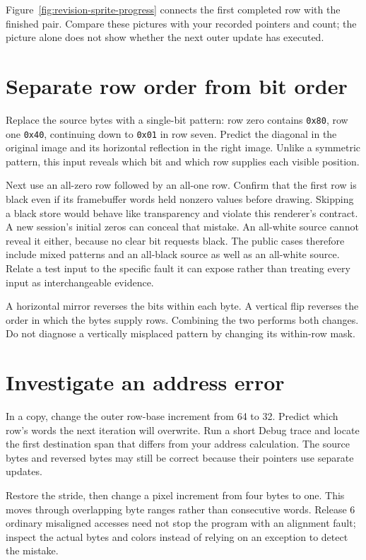 Figure~\ref{fig:revision-sprite-progress} connects the first completed row with
the finished pair. Compare these pictures with your recorded pointers and count;
the picture alone does not show whether the next outer update has executed.



\section{Separate row order from bit order}

Replace the source bytes with a single-bit pattern: row zero contains
\texttt{0x80}, row one \texttt{0x40}, continuing down to \texttt{0x01} in row
seven. Predict the diagonal in the original image and its horizontal reflection
in the right image. Unlike a symmetric pattern, this input reveals which bit and
which row supplies each visible position.

Next use an all-zero row followed by an all-one row. Confirm that the first row
is black even if its framebuffer words held nonzero values before drawing.
Skipping a black store would behave like transparency and violate this renderer's
contract. A new session's initial zeros can conceal that mistake. An all-white
source cannot reveal it either, because no clear bit requests black. The public
cases therefore include mixed patterns and an all-black source as well as an
all-white source. Relate a test input to the specific fault it can expose rather
than treating every input as interchangeable evidence.

A horizontal mirror reverses the bits within each byte. A vertical flip reverses
the order in which the bytes supply rows. Combining the two performs both changes.
Do not diagnose a vertically misplaced pattern by changing its within-row mask.

\section{Investigate an address error}

In a copy, change the outer row-base increment from 64 to 32. Predict which row's
words the next iteration will overwrite. Run a short Debug trace and locate the
first destination span that differs from your address calculation. The source
bytes and reversed bytes may still be correct because their pointers use separate
updates.

Restore the stride, then change a pixel increment from four bytes to one. This
moves through overlapping byte ranges rather than consecutive words. Release 6
ordinary misaligned accesses need not stop the program with an alignment fault;
inspect the actual bytes and colors instead of relying on an exception to detect
the mistake.

